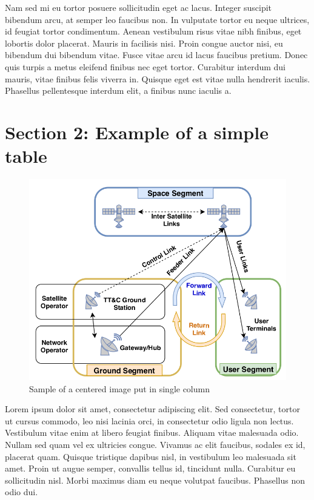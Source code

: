 Nam sed mi eu tortor posuere sollicitudin eget ac lacus. Integer suscipit bibendum arcu, at semper leo faucibus non. In vulputate tortor eu neque ultrices, id feugiat tortor condimentum. Aenean vestibulum risus vitae nibh finibus, eget lobortis dolor placerat. Mauris in facilisis nisi. Proin congue auctor nisi, eu bibendum dui bibendum vitae. Fusce vitae arcu id lacus faucibus pretium. Donec quis turpis a metus eleifend finibus nec eget tortor. Curabitur interdum dui mauris, vitae finibus felis viverra in. Quisque eget est vitae nulla hendrerit iaculis. Phasellus pellentesque interdum elit, a finibus nunc iaculis a.
\section{Section 2: Example of a simple table} \label{sec:sec2}
\begin{figure}[t!]
 \centering
 \includegraphics[scale=0.35]{figures/intro/3.png}
 \caption{Sample of a centered image put in single column}\label{img:img2}
\end{figure}
Lorem ipsum dolor sit amet, consectetur adipiscing elit. Sed consectetur, tortor ut cursus commodo, leo nisi lacinia orci, in consectetur odio ligula non lectus. Vestibulum vitae enim at libero feugiat finibus. Aliquam vitae malesuada odio. Nullam sed quam vel ex ultricies congue. Vivamus ac elit faucibus, sodales ex id, placerat quam. Quisque tristique dapibus nisl, in vestibulum leo malesuada sit amet. Proin ut augue semper, convallis tellus id, tincidunt nulla. Curabitur eu sollicitudin nisl. Morbi maximus diam eu neque volutpat faucibus. Phasellus non odio dui.

